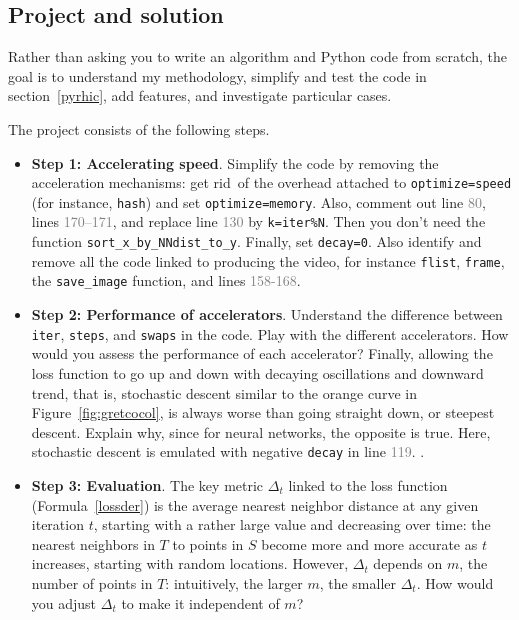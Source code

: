 \documentclass[oneside,10pt]{book}
\begin{document}
\subsection{Project and solution}

Rather than asking you to write an algorithm and Python code from scratch, the goal is to understand my methodology, 
simplify and test the code in section~\ref{pyrhic}, add features, and investigate particular cases. 

\noindent The project consists of the following steps.
\vspace{1ex}
\begin{itemize}
\item[] {\bf Step 1:  Accelerating speed}. Simplify the code by removing the acceleration mechanisms: get rid~of the overhead attached to \texttt{optimize=\textquotesingle speed\textquotesingle} 
 (for instance, \texttt{hash}) and set \texttt{optimize=\textquotesingle memory\textquotesingle}. Also,  comment out line \textcolor{gray}{80}, 
 lines \textcolor{gray}{170--171}, and replace line \textcolor{gray}{130} by \texttt{k=iter\%N}. Then you don't need the
 function \texttt{sort\_x\_by\_NNdist\_to\_y}. Finally, set \texttt{decay=0}. Also identify and remove all the code linked to producing the video,
 for instance \texttt{flist}, \texttt{frame}, the \texttt{save\_image} function, and lines \textcolor{gray}{158-168}.
\vspace{1ex}
\item[] {\bf Step 2:  Performance of accelerators}. Understand the difference between \texttt{iter}, \texttt{steps}, and \texttt{swaps} in the code. 
Play with the different accelerators. How would you assess the performance of each accelerator? Finally, allowing the loss function to go up and down with
 decaying oscillations and downward trend, that is, 
\textcolor{index}{stochastic descent} similar to the orange curve in Figure~\ref{fig:gretcocol}, is always worse than going straight down, or \textcolor{index}{steepest descent}. Explain why, since for neural networks, the opposite is true. Here, stochastic descent is emulated with negative \texttt{decay} in line \textcolor{gray}{119}.
\vspace{1ex}.
 \item[] {\bf Step 3:  Evaluation}. The key metric $\Delta_t$ linked to the 
\textcolor{index}{loss function} (Formula~\ref{lossder}) is the average nearest neighbor distance at any given iteration $t$, 
starting with a rather large value and decreasing over time:
 the nearest neighbors in $T$ to points in $S$ become more and more accurate as $t$ increases, starting with random locations. However,  
$\Delta_t$ depends on $m$, the number of points in $T$: intuitively, the larger $m$, the smaller $\Delta_t$. How would you adjust $\Delta_t$ to make it independent of $m$? 
\end{itemize}
\vspace{1ex}
\end{document}

